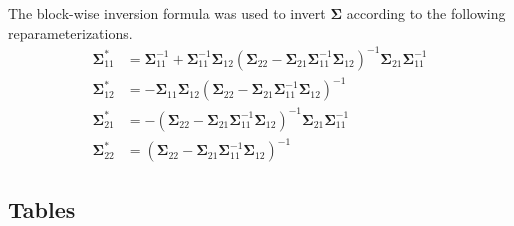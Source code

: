 \documentclass{article}
\begin{document}
The block-wise inversion formula was used to invert $\boldsymbol\Sigma$ according to the following reparameterizations.
\begin{align*}
\boldsymbol\Sigma_{11}^* & = \boldsymbol\Sigma_{11}^{-1} + \boldsymbol\Sigma_{11}^{-1}\boldsymbol\Sigma_{12}(\boldsymbol\Sigma_{22} - \boldsymbol\Sigma_{21}\boldsymbol\Sigma_{11}^{-1}\boldsymbol\Sigma_{12})^{-1}\boldsymbol\Sigma_{21}\boldsymbol\Sigma_{11}^{-1}\\
\boldsymbol\Sigma_{12}^* & = -\boldsymbol\Sigma_{11} \boldsymbol\Sigma_{12}(\boldsymbol\Sigma_{22}-\boldsymbol\Sigma_{21}\boldsymbol\Sigma_{11}^{-1}\boldsymbol\Sigma_{12})^{-1}\\
\boldsymbol\Sigma_{21}^* & = -(\boldsymbol\Sigma_{22} - \boldsymbol\Sigma_{21}\boldsymbol\Sigma_{11}^{-1}\boldsymbol\Sigma_{12})^{-1}\boldsymbol\Sigma_{21}\boldsymbol\Sigma_{11}^{-1}\\
\boldsymbol\Sigma_{22}^* & = (\boldsymbol\Sigma_{22} - \boldsymbol\Sigma_{21}\boldsymbol\Sigma_{11}^{-1}\boldsymbol\Sigma_{12})^{-1}     
\end{align*}

\subsection{Tables}
\end{document}
